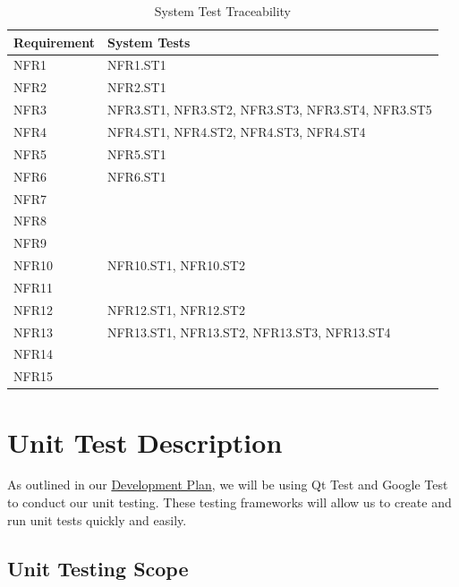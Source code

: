 \documentclass[12pt, titlepage]{article}
\begin{document}
\begin{longtable}{|p{} | p{}|}
  \caption{System Test Traceability}
  \label{TblSTTraceability}\\
  \hline
  \textbf{Requirement} & \textbf{System Tests}\\
  \hline
  NFR1 & NFR1.ST1\\
  \hline
  NFR2 & NFR2.ST1\\
  \hline
  NFR3 & NFR3.ST1, NFR3.ST2, NFR3.ST3, NFR3.ST4, NFR3.ST5\\
  \hline
  NFR4 & NFR4.ST1, NFR4.ST2, NFR4.ST3, NFR4.ST4\\
  \hline
  NFR5 & NFR5.ST1\\
  \hline
  NFR6 & NFR6.ST1\\
  \hline
  NFR7 & \\
  \hline
  NFR8 & \\
  \hline
  NFR9 & \\
  \hline
  NFR10 & NFR10.ST1, NFR10.ST2\\
  \hline
  NFR11 & \\
  \hline
  NFR12 & NFR12.ST1, NFR12.ST2\\
  \hline
  NFR13 & NFR13.ST1, NFR13.ST2, NFR13.ST3, NFR13.ST4\\
  \hline
  NFR14 & \\
  \hline
  NFR15 & \\
  \hline
\end{longtable}


\section{Unit Test Description}

As outlined in our \href{https://github.com/agentvv/MTOBridge/blob/main/docs/DevelopmentPlan/DevelopmentPlan.pdf}{Development Plan}, we will be using Qt Test and Google Test to conduct our unit testing. These testing frameworks will allow us to create and run unit tests quickly and easily.

\subsection{Unit Testing Scope}

\end{document}
